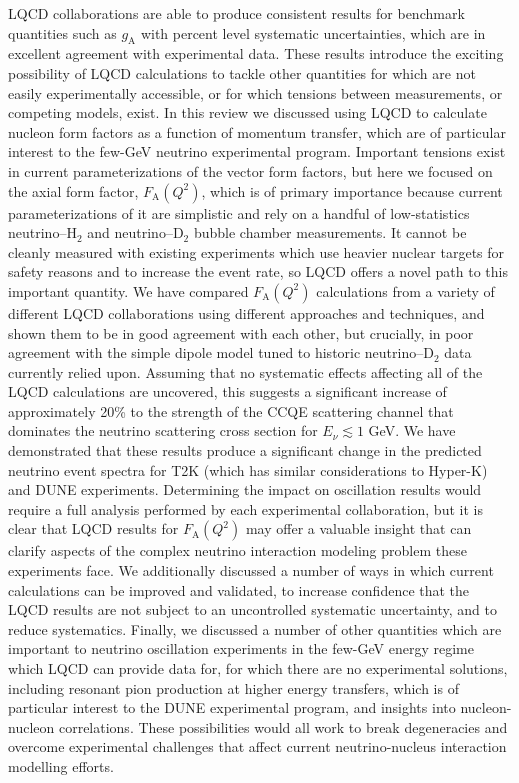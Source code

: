 LQCD collaborations are able to produce consistent results for benchmark quantities such as $g_{\mathrm{A}}$ with percent level systematic uncertainties, which are in excellent agreement with experimental data.
These results introduce the exciting possibility of LQCD calculations to tackle other quantities for which are not easily experimentally accessible, or for which tensions between measurements, or competing models, exist.
In this review we discussed using LQCD to calculate nucleon form factors as a function of momentum transfer, which are of particular interest to the few-GeV neutrino experimental program.
Important tensions exist in current parameterizations of the vector form factors, but here we focused on the axial form factor, $F_{\mathrm{A}}(Q^2)$, which is of primary importance because current parameterizations of it are simplistic and rely on a handful of low-statistics neutrino--H$_2$ and neutrino--D$_2$ bubble chamber measurements.
It cannot be cleanly measured with existing experiments which use heavier nuclear targets for safety reasons and to increase the event rate, so LQCD offers a novel path to this important quantity.
We have compared $F_{\mathrm{A}}(Q^2)$ calculations from a variety of different LQCD collaborations using different approaches and techniques, and shown them to be in good agreement with each other, but crucially, in poor agreement with the simple dipole model tuned to historic neutrino--D$_2$ data currently relied upon.
Assuming that no systematic effects affecting all of the LQCD calculations are uncovered, this suggests a significant increase of approximately 20\% to the strength of the CCQE scattering channel that dominates the neutrino scattering cross section for $E_{\nu} \lesssim 1$ GeV.
We have demonstrated that these results produce a significant change in the predicted neutrino event spectra for T2K (which has similar considerations to Hyper-K) and DUNE experiments.
Determining the impact on oscillation results would require a full analysis performed by each experimental collaboration, but it is clear that LQCD results for $F_{\mathrm{A}}(Q^2)$ may offer a valuable insight that can clarify aspects of the complex neutrino interaction modeling problem these experiments face.
We additionally discussed a number of ways in which current calculations can be improved and validated, to increase confidence that the LQCD results are not subject to an uncontrolled systematic uncertainty, and to reduce systematics.
Finally, we discussed a number of other quantities which are important to neutrino oscillation experiments in the few-GeV energy regime which LQCD can provide data for, for which there are no experimental solutions, including resonant pion production at higher energy transfers, which is of particular interest to the DUNE experimental program, and insights into nucleon-nucleon correlations.
These possibilities would all work to break degeneracies and overcome experimental challenges that affect current neutrino-nucleus interaction modelling efforts.

